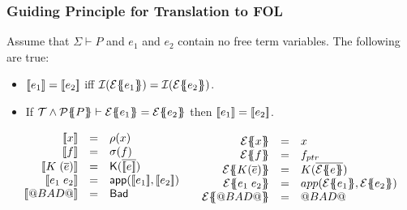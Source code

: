 \documentclass[serif,professionalfont]{beamer}
\begin{document}
\begin{frame}[fragile]
  \frametitle{Guiding Principle for Translation to FOL}

  \begin{theorem}
  Assume that $\Sigma \vdash P$ and $e_1$ and $e_2$ contain no free term variables. The following
  are true:
  \begin{itemize}
    \item $[\![e_1]\!] = [\![e_2]\!]$ iff ${\cal I}(\etrans{}{}{e_1}) = {\cal I}(\etrans{}{}{e_2})$.
    \item If $\Th \land \ptrans{\Sigma}{P} \vdash \etrans{}{}{e_1} = \etrans{}{}{e_2}$ then $[\![e_1]\!] = [\![e_2]\!]$.
  \end{itemize}
  \end{theorem}
  \[\begin{array}{cc}

    \begin{array}{rcl}
      \interp{x}{\sigma}{\rho}                    & {=} & \rho(x) \\
      \interp{f}{\sigma}{\rho}           & {=} & \sigma(f) \\
      \interp{K\;(\ol{e})}{\sigma}{\rho} & {=} & \roll{\ret{\injK{K}{\ol{\interp{e}{\sigma}{\rho}}}}} \\
      \interp{e_1\;e_2}{\sigma}{\rho}             & {=} & \dapp(\interp{e_1}{\sigma}{\rho}, \interp{e_2}{\sigma}{\rho}) \\
      \interp{@BAD@}{\sigma}{\rho}                & {=} & \roll{\ret{\injBad}} \\[2mm]
    \end{array}

    &

    \begin{array}{rcl}
    \etrans{\Sigma}{\Gamma}{x}                    & {=} & \formula{x} \\
    \etrans{\Sigma}{\Gamma}{f}         & {=} & \formula{f_{ptr}} \\
    \etrans{\Sigma}{\Gamma}{K(\ol{e})} & {=} & \formula{K(\ol{\etrans{\Sigma}{\Gamma}{e}})} \\
    \etrans{\Sigma}{\Gamma}{e_1\;e_2}             & {=} & \formula{app(\etrans{\Sigma}{\Gamma}{e_1},
                                                           \etrans{\Sigma}{\Gamma}{e_2})} \\
    \etrans{\Sigma}{\Gamma}{@BAD@}                & {=} & \formula{\bad}
    \end{array}

  \end{array}\]

\end{frame}
\end{document}
